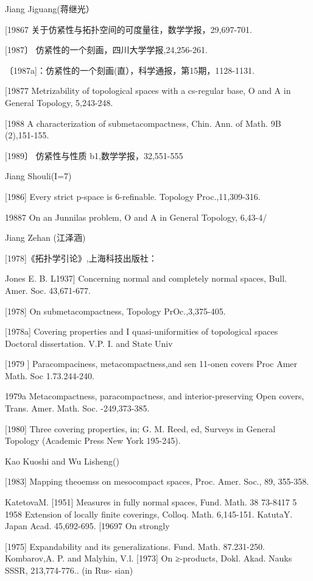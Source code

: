 \documentclass[main.tex]{subfiles}
\begin{document}
\noindent Jiang Jiguang(蒋继光）

[19867 关于仿紧性与拓扑空间的可度量往，数学学报，29,697-701.

[1987〕 仿紧性的一个刻画，四川大学学报,24,256-261.

〔1987a]：仿紧性的一个刻画(直），科学通报，第15期，1128-1131.

[19877 Metrizability of topological spaces with a cs-regular base, O and A
in General Topology, 5,243-248.

[1988 A characterization of submetacompactness, Chin. Ann. of Math. 9B
(2),151-155.

[1989〕 仿紧性与性质 b1,数学学报，32,551-555

\noindent Jiang Shouli(I=7)

[1986] Every strict p-space is 6-refinable. Topology Proc.,11,309-316.

19887 On an Junnilas problem, O and A in General Topology, 6,43-4/

Jiang Zehan (江泽涵)

[1978]《拓扑学引论》,上海科技出版社：

\noindent Jones E. B.
L1937] Concerning normal and completely normal spaces, Bull. Amer. Soc.
43,671-677.

[1978]
On submetacompactness, Topology PrOc.,3,375-405.

[1978a]
Covering properties and
I quasi-uniformities of topological spaces
Doctoral dissertation. V.P. I. and State Univ

[1979 ]
Paracompaciness,
metacompactness,and
sen
11-onen
covers
Proc
Amer Math. Soc
1.73.244-240.

1979a Metacompactness, paracompactness, and
interior-preserving Open
covers, Trans. Amer. Math. Soc. -249,373-385.

[1980]
Three covering properties, in; G. M. Reed, ed, Surveys in General
Topology (Academic Press New York 195-245).

Kao Kuoshi and Wu Lisheng()

[1983]
Mapping theoemss on mesocompact spaces, Proc. Amer. Soc., 89,
355-358.

KatetovaM.
[1951]
Measures in fully normal spaces, Fund. Math. 38 73-8417
5 1958 Extension
of locally finite coverings, Colloq. Math. 6,145-151.
KatutaY.
Japan Acad. 45,692-695.
[19697
On strongly

[1975]
Expandability and its generalizations. Fund. Math. 87.231-250.
Kombarov,A. P. and Malyhin, V.l.
[1973] On ≥-products, Dokl. Akad. Nauks SSSR, 213,774-776.. (in Rus-
sian)
\end{document}
